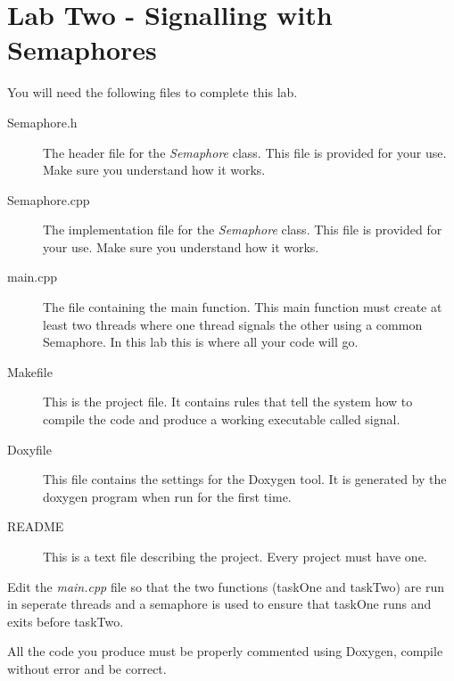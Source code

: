\documentclass[10pt,a4paper]{article}
\begin{document}
\section{Lab Two - Signalling with Semaphores}
You will need the following files to complete this lab.
\begin{description}
\item[Semaphore.h] The header file for the \textit{Semaphore} class.  This file is provided for your use.  Make sure you understand how it works.
\item[Semaphore.cpp] The implementation file for the \textit{Semaphore} class.  This file is provided for your use.  Make sure you understand how it works.
\item[main.cpp] The file containing the main function.  This main function must create at least two threads where one thread signals the other using a common Semaphore.  In this lab this is where all your code will go.
\item[Makefile] This is the project file. It contains rules that tell the system how to compile the code and produce a working executable called signal.
\item[Doxyfile] This file contains the settings for the Doxygen tool. It is generated by the doxygen program when run for the first time.
\item[README] This is a text file describing the project. Every project must have one.
\end{description}

Edit the \textit{main.cpp} file so that the two functions (taskOne and taskTwo) are run in seperate threads and a semaphore is used to ensure that taskOne runs and exits before taskTwo.

All the code you produce must be properly commented using Doxygen, compile without error and be correct.
 
\end{document}
